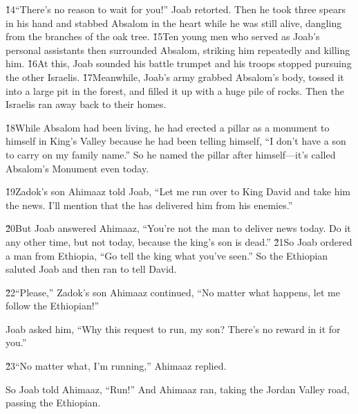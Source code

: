 \v{14}``There's no reason to wait for you!'' Joab retorted. Then he took three spears in his hand and stabbed Absalom in the heart while he was still alive, dangling from the branches of the oak tree. \v{15}Ten young men who served as Joab's personal assistants then surrounded Absalom, striking him repeatedly and killing him. \v{16}At this, Joab sounded his battle trumpet and his troops stopped pursuing the other Israelis. \v{17}Meanwhile, Joab's army grabbed Absalom's body, tossed it into a large pit in the forest, and filled it up with a huge pile of rocks. Then the Israelis ran away back to their homes.

\v{18}While Absalom had been living, he had erected a pillar as a monument to himself in King's Valley because he had been telling himself, ``I don't have a son to carry on my family name.'' So he named the pillar after himself---it's called Absalom's Monument even today.

\v{19}Zadok's son Ahimaaz told Joab, ``Let me run over to King David and take him the news. I'll mention that the  has delivered him from his enemies.''

\v{20}But Joab answered Ahimaaz, ``You're not the man to deliver news today. Do it any other time, but not today, because the king's son is dead.'' \v{21}So Joab ordered a man from Ethiopia, ``Go tell the king what you've seen.'' So the Ethiopian saluted Joab and then ran to tell David.

\v{22}``Please,'' Zadok's son Ahimaaz continued, ``No matter what happens, let me follow the Ethiopian!''

Joab asked him, ``Why this request to run, my son? There's no reward in it for you.''

\v{23}``No matter what, I'm running,'' Ahimaaz replied.

So Joab told Ahimaaz, ``Run!'' And Ahimaaz ran, taking the Jordan Valley road, passing the Ethiopian.

